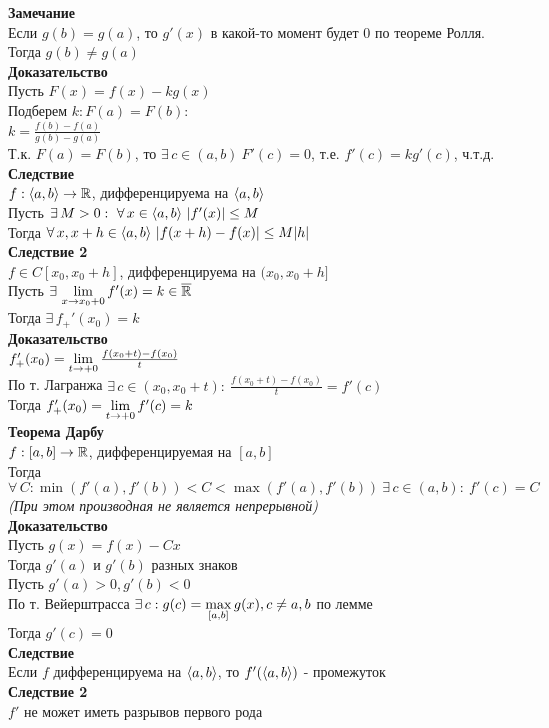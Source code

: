 \documentclass[12pt]{article}
\begin{document}
\textbf{Замечание}\\
Если $g(b)=g(a)$, то $g'(x)$ в какой-то момент будет 0 по теореме Ролля. Тогда $g(b) \neq g(a)$\\
\textbf{Доказательство}\\
Пусть $F(x) = f(x)-kg(x)$\\
Подберем $k: F(a) = F(b)$:\\
$k = \frac{f(b)-f(a)}{g(b)-g(a)}$\\
Т.к. $F(a) = F(b)$, то $\exists\,c\in (a,b)\ F'(c) = 0$, т.е. $f'(c) = k g'(c)$, ч.т.д.\\
\textbf{Следствие}\\
$f: \langle a, b \rangle \rightarrow \mathbb{R}$, дифференцируема на $\langle a, b \rangle$\\
Пусть $\exists\,M>0:\ \forall\,x\in \langle a,b \rangle\ |f'(x)| \leq M$\\
Тогда $\forall\,x,x+h \in \lan a,b\ran\ |f(x+h)-f(x)| \leq M|h|$\\
\textbf{Следствие 2}\\
$f\in C[x_0, x_0+h]$, дифференцируема на $(x_0, x_0+h]$\\
Пусть $\exists\,\lim\limits_{x\rightarrow x_0+0} f'(x) = k\in \overline{\mathbb{R}}$\\
Тогда $\exists\,f_+'(x_0) = k$\\
\textbf{Доказательство}\\
$f_+'(x_0) = \lim\limits_{t\rightarrow +0} \frac{f(x_0+t)-f(x_0)}{t}$\\
По т. Лагранжа $\exists\,c\in(x_0, x_0+t):\ \frac{f(x_0+t)-f(x_0)}{t} = f'(c)$\\
Тогда $f_+'(x_0) = \lim\limits_{t\rightarrow +0} f'(c) = k$\\
\textbf{Теорема Дарбу}\\
$f:[a,b] \rightarrow \mathbb{R}$, дифференцируемая на $[a,b]$\\
Тогда $\forall\, C: \min(f'(a), f'(b)) < C < \max(f'(a), f'(b))\ \exists\,c\in (a,b):\ f'(c) = C$\\
\textit{(При этом производная не является непрерывной)}\\
\textbf{Доказательство}\\
Пусть $g(x) = f(x) - Cx$\\
Тогда $g'(a)$ и $g'(b)$ разных знаков\\
Пусть $g'(a) > 0, g'(b) < 0$\\
По т. Вейерштрасса $\exists\,c: g(c) = \max\limits_{[a,b]} g(x), c \neq a,b$ по лемме\\
Тогда $g'(c) = 0$\\
\textbf{Следствие}\\
Если $f$ дифференцируема на $\langle a,b \rangle$, то $f'(\langle a, b \rangle)$ - промежуток\\
\textbf{Следствие 2}\\
$f'$ не может иметь разрывов первого рода\\
\end{document}
